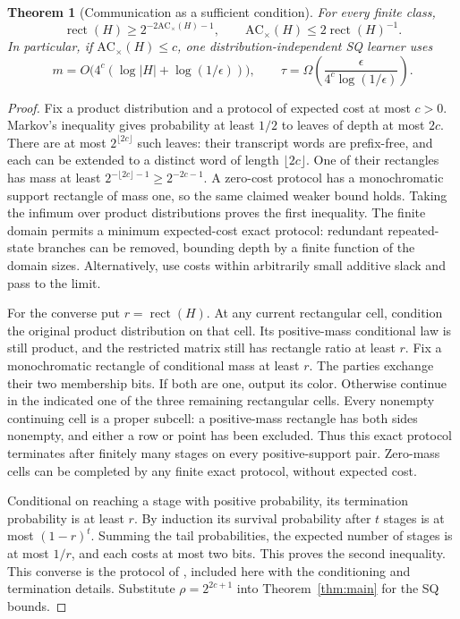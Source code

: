 \documentclass[11pt]{article}
\newtheorem{theorem}{Theorem}
\DeclareMathOperator{\rect}{rect}
\newcommand{\1}{\mathbf 1}
\begin{document}
\begin{samepage}
\begin{theorem}[Communication as a sufficient condition]\label{thm:communication}
For every finite class,
\[
 \rect(H)\ge2^{-2\mathrm{AC}_{\times}(H)-1},
 \qquad
 \mathrm{AC}_{\times}(H)\le2\rect(H)^{-1}.
\]
In particular, if $\mathrm{AC}_{\times}(H)\le c$, one distribution-independent SQ learner uses
\[
 m=O\bigl(4^c(\log|H|+\log(1/\epsilon))\bigr),\qquad
 \tau=\Omega\!\left(\frac{\epsilon}{4^c\log(1/\epsilon)}\right).
\]
\end{theorem}
\end{samepage}
\begin{proof}
Fix a product distribution and a protocol of expected cost at most $c>0$. Markov's inequality gives probability at least $1/2$ to leaves of depth at most $2c$. There are at most $2^{\lfloor2c\rfloor}$ such leaves: their transcript words are prefix-free, and each can be extended to a distinct word of length $\lfloor2c\rfloor$. One of their rectangles has mass at least $2^{-\lfloor2c\rfloor-1}\ge2^{-2c-1}$. A zero-cost protocol has a monochromatic support rectangle of mass one, so the same claimed weaker bound holds. Taking the infimum over product distributions proves the first inequality. The finite domain permits a minimum expected-cost exact protocol: redundant repeated-state branches can be removed, bounding depth by a finite function of the domain sizes. Alternatively, use costs within arbitrarily small additive slack and pass to the limit.

For the converse put $r=\rect(H)$. At any current rectangular cell, condition the original product distribution on that cell. Its positive-mass conditional law is still product, and the restricted matrix still has rectangle ratio at least $r$. Fix a monochromatic rectangle of conditional mass at least $r$. The parties exchange their two membership bits. If both are one, output its color. Otherwise continue in the indicated one of the three remaining rectangular cells. Every nonempty continuing cell is a proper subcell: a positive-mass rectangle has both sides nonempty, and either a row or point has been excluded. Thus this exact protocol terminates after finitely many stages on every positive-support pair. Zero-mass cells can be completed by any finite exact protocol, without expected cost.

Conditional on reaching a stage with positive probability, its termination probability is at least $r$. By induction its survival probability after $t$ stages is at most $(1-r)^t$. Summing the tail probabilities, the expected number of stages is at most $1/r$, and each costs at most two bits. This proves the second inequality. This converse is the protocol of \citet[Proposition~3.14]{HHPTZ22}, included here with the conditioning and termination details. Substitute $\rho=2^{2c+1}$ into Theorem~\ref{thm:main} for the SQ bounds.
\end{proof}
\end{document}
